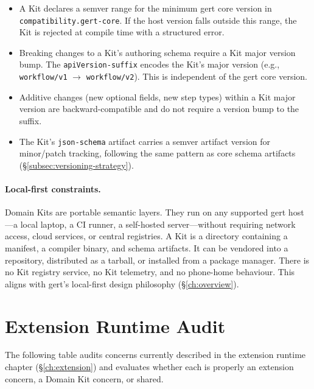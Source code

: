 \begin{itemize}
  \item A Kit declares a semver range for the minimum gert core version in
    \texttt{compatibility.gert-core}.  If the host version falls outside this
    range, the Kit is rejected at compile time with a structured error.

  \item Breaking changes to a Kit's authoring schema require a Kit major
    version bump.  The \texttt{apiVersion-suffix} encodes the Kit's major
    version (e.g., \texttt{workflow/v1} $\to$ \texttt{workflow/v2}).  This is
    independent of the gert core version.

  \item Additive changes (new optional fields, new step types) within a Kit
    major version are backward-compatible and do not require a version bump to
    the suffix.

  \item The Kit's \texttt{json-schema} artifact carries a semver artifact
    version for minor/patch tracking, following the same pattern as core schema
    artifacts (\S\ref{subsec:versioning-strategy}).
\end{itemize}

\paragraph{Local-first constraints.}

Domain Kits are portable semantic layers.  They run on any supported gert
host---a local laptop, a CI runner, a self-hosted server---without requiring
network access, cloud services, or central registries.  A Kit is a directory
containing a manifest, a compiler binary, and schema artifacts.  It can be
vendored into a repository, distributed as a tarball, or installed from a
package manager.  There is no Kit registry service, no Kit telemetry, and no
phone-home behaviour.  This aligns with gert's local-first design philosophy
(\S\ref{ch:overview}).

\section{Extension Runtime Audit}
\label{sec:kit-ext-audit}

The following table audits concerns currently described in the extension
runtime chapter (\S\ref{ch:extension}) and evaluates whether each is properly
an extension concern, a Domain Kit concern, or shared.

